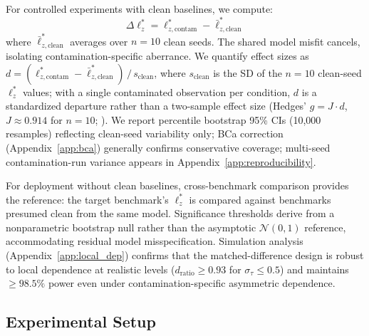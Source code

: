 For controlled experiments with clean baselines, we compute:
\begin{equation}
  \Delta\ell_z^* = \ell_{z,\text{contam}}^{*} - \bar{\ell}_{z,\text{clean}}^{*}
  \label{eq:delta_lz}
\end{equation}
where $\bar{\ell}_{z,\text{clean}}^{*}$ averages over $n{=}10$ clean seeds.
The shared model misfit cancels, isolating contamination-specific aberrance.
We quantify effect sizes as $d = (\ell_{z,\text{contam}}^{*} - \bar{\ell}_{z,\text{clean}}^{*})\,/\,s_{\text{clean}}$, where $s_{\text{clean}}$ is the SD of the $n{=}10$ clean-seed $\ell_z^*$ values; with a single contaminated observation per condition, $d$ is a standardized departure rather than a two-sample effect size (Hedges' $g = J \cdot d$, $J \approx 0.914$ for $n{=}10$; \citealp{hedges1981}).
We report percentile bootstrap 95\% CIs (10,000 resamples) reflecting clean-seed variability only; BCa correction (Appendix~\ref{app:bca}) generally confirms conservative coverage; multi-seed contamination-run variance appears in Appendix~\ref{app:reproducibility}.

For deployment without clean baselines, cross-benchmark comparison provides the reference: the target benchmark's $\ell_z^*$ is compared against benchmarks presumed clean from the same model.
Significance thresholds derive from a nonparametric bootstrap null rather than the asymptotic $\mathcal{N}(0,1)$ reference, accommodating residual model misspecification.
Simulation analysis (Appendix~\ref{app:local_dep}) confirms that the matched-difference design is robust to local dependence at realistic levels ($d_{\text{ratio}} \geq 0.93$ for $\sigma_\tau \leq 0.5$) and maintains ${\geq}98.5\%$ power even under contamination-specific asymmetric dependence.

\subsection{Experimental Setup}
\label{sec:setup}

